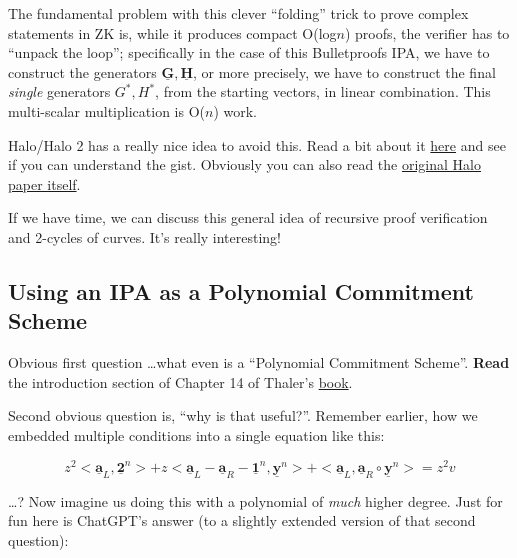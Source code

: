 \documentclass[10pt,a4paper]{article}
\begin{document}
The fundamental problem with this clever ``folding'' trick to prove complex statements in ZK is, while it produces compact O(log$n$) proofs, the verifier has to ``unpack the loop''; specifically in the case of this Bulletproofs IPA, we have to construct the generators $\underline{\textbf{G}},\underline{\textbf{H}}$, or more precisely, we have to construct the final \emph{single} generators $G^*, H^*$, from the starting vectors, in linear combination. This multi-scalar multiplication is O($n$) work.

\vspace{5 pt}

Halo/Halo 2 has a really nice idea to avoid this. Read a bit about it \href{https://zcash.github.io/halo2/background/recursion.html}{here} and see if you can understand the gist. Obviously you can also read the \href{https://eprint.iacr.org/2019/1021.pdf}{original Halo paper itself}.

\vspace{5 pt}

If we have time, we can discuss this general idea of recursive proof verification and 2-cycles of curves. It's really interesting!


\subsection{Using an IPA as a Polynomial Commitment Scheme}

Obvious first question \ldots what even is a ``Polynomial Commitment Scheme''. \textbf{Read} the introduction section of Chapter 14 of Thaler's \href{https://people.cs.georgetown.edu/jthaler/ProofsArgsAndZK.pdf}{book}.

\vspace{5 pt}

Second obvious question is, ``why is that useful?''. Remember earlier, how we embedded multiple conditions into a single equation like this:

$$z^2 <\underline{\textbf{a}}_L, \underline{\textbf{2}}^n> + z<\underline{\textbf{a}}_L - \underline{\textbf{a}}_R - \underline{\textbf{1}}^n, \underline{\textbf{y}}^n> + <\underline{\textbf{a}}_L, \underline{\textbf{a}}_R \circ \underline{\textbf{y}}^n> = z^2v$$

\ldots ? Now imagine us doing this with a polynomial of \emph{much} higher degree. Just for fun here is ChatGPT's answer (to a slightly extended version of that second question):
\end{document}
